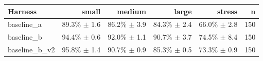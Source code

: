 \begin{tabular}{lrrrrr}
\toprule
Harness & small & medium & large & stress & n \\
\midrule
baseline\_a & 89.3\% $\pm$ 1.6 & 86.2\% $\pm$ 3.9 & 84.3\% $\pm$ 2.4 & 66.0\% $\pm$ 2.8 & 150 \\
baseline\_b & 94.4\% $\pm$ 0.6 & 92.0\% $\pm$ 1.1 & 90.7\% $\pm$ 3.7 & 74.5\% $\pm$ 8.4 & 150 \\
baseline\_b\_v2 & 95.8\% $\pm$ 1.4 & 90.7\% $\pm$ 0.9 & 85.3\% $\pm$ 0.5 & 73.3\% $\pm$ 0.9 & 150 \\
\bottomrule
\end{tabular}
